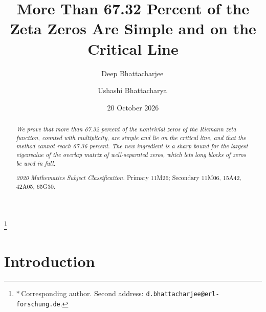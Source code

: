 \documentclass[aps,prd,twocolumn,superscriptaddress,nofootinbib,longbibliography,floatfix,showkeys,amsmath,amssymb,10pt]{revtex4-2}
\theoremstyle{definition}
\theoremstyle{remark}
\begin{document}
\title{More Than 67.32 Percent of the Zeta Zeros Are Simple and on the Critical Line}

\author{Deep Bhattacharjee\,}
\thanks{$*$\,Corresponding author. Second address:
\nolinkurl{d.bhattacharjee@erl-forschung.de}.}

\author{Ushashi Bhattacharya\,}

\date{20 October 2026}

\begin{abstract}
\itshape
We prove that more than 67.32 percent of the nontrivial zeros of the
Riemann zeta function, counted with multiplicity, are simple and lie on the
critical line, and that the method cannot reach 67.36 percent. The new
ingredient is a sharp bound for the largest eigenvalue of the overlap matrix
of well-separated zeros, which lets long blocks of zeros be used in full.
\par\medskip\upshape\noindent
\textit{2020 Mathematics Subject Classification.} Primary 11M26;
Secondary 11M06, 15A42, 42A05, 65G30.
\end{abstract}


\maketitle

\makeatletter
\renewcommand\l@subsection[2]{}
\renewcommand\l@subsubsection[2]{}
\makeatother
\tableofcontents

\section{Introduction}\label{sec:intro}
\end{document}
